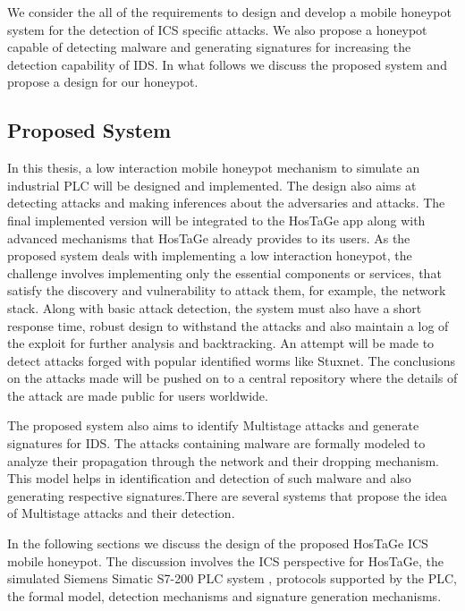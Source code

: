 \documentclass[article,msc=informatik,type=msc,colorback,accentcolor=tud9c]{tudthesis}
\begin{document}
  	We consider the all of the requirements to design and  develop a mobile honeypot system for the detection of \ac{ICS} specific attacks. We also propose a honeypot capable of detecting malware and generating signatures for increasing the detection capability of \ac{IDS}. In what follows we discuss the proposed system and propose a design for our honeypot.
  
  \subsection{Proposed System}\label{Proposed System}
    
   
      In this thesis, a low interaction mobile honeypot mechanism to simulate an industrial \ac{PLC} will be designed and implemented. The design also aims at detecting attacks and making inferences about the adversaries and attacks. The final implemented version will be integrated to the HosTaGe app along with advanced mechanisms that HosTaGe already provides to its users.  
      As the proposed system deals with implementing a low interaction honeypot, the challenge involves implementing only the essential components or services, that satisfy the discovery and vulnerability to attack them, for example, the network stack. Along with basic attack detection, the system must also have a short response time, robust design to withstand the attacks and also maintain a log of the exploit for further analysis and backtracking. An attempt will be made to detect attacks forged with popular identified worms like Stuxnet. The conclusions on the attacks made will be pushed on to a central repository where the details of the attack are made public for users worldwide.
    	
    	
    	\vspace{3mm}   	
    	The proposed system also aims to identify Multistage attacks and generate signatures for IDS. The attacks containing malware are formally modeled to analyze their propagation through the network and their dropping mechanism. This model helps in identification and detection of such malware and also generating respective signatures.There are several systems that propose the idea of Multistage attacks and their detection. 
    	
    	
    	\vspace{3mm}   	
   		In the following sections we discuss the design of the proposed HosTaGe ICS mobile honeypot. The discussion involves the \ac{ICS} perspective for HosTaGe, the simulated Siemens Simatic S7-200 \ac{PLC} system , protocols supported by the \ac{PLC}, the formal model, detection mechanisms and signature generation mechanisms.
   		
\end{document}

